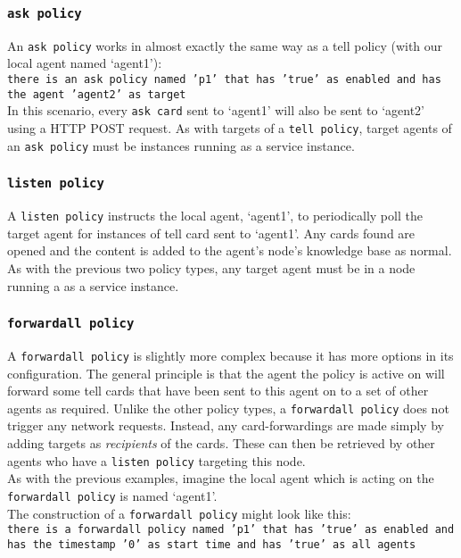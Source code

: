 \documentclass{article}
\begin{document}
\subsubsection{\texttt{ask policy}}
An \texttt{ask policy} works in almost exactly the same way as a tell policy (with our local agent named `agent1'):\\
\texttt{there is an ask policy named 'p1' that has 'true' as enabled and has the agent 'agent2' as target}\\

In this scenario, every \texttt{ask card} sent to `agent1' will also be sent to `agent2' using a HTTP POST request. As with targets of a \texttt{tell policy}, target agents of an \texttt{ask policy} must be instances running as a service instance.


\subsubsection{\texttt{listen policy}}
A \texttt{listen policy} instructs the local agent, `agent1', to periodically poll the target agent for instances of tell card sent to `agent1'. Any cards found are opened and the content is added to the agent's node's knowledge base as normal.\\

As with the previous two policy types, any target agent must be in a node running a as a service instance.

\subsubsection{\texttt{forwardall policy}}
A \texttt{forwardall policy} is slightly more complex because it has more options in its configuration. The general principle is that the agent the policy is active on will forward some tell cards that have been sent to this agent on to a set of other agents as required. Unlike the other policy types, a \texttt{forwardall policy} does not trigger any network requests. Instead, any card-forwardings are made simply by adding targets as \textit{recipients} of the cards. These can then be retrieved by other agents who have a \texttt{listen policy} targeting this node.\\

As with the previous examples, imagine the local agent which is acting on the \texttt{forwardall policy} is named `agent1'.\\

The construction of a \texttt{forwardall policy} might look like this:\\
\texttt{there is a forwardall policy named 'p1' that has 'true' as enabled and has the timestamp '0' as start time and has 'true' as all agents}\\
\end{document}
